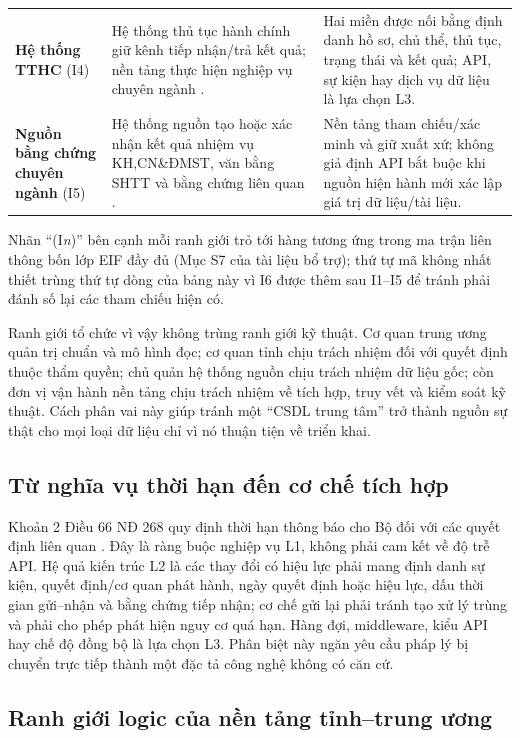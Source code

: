 {\begin{longtable}{@{}p{3.0cm}p{5.0cm}p{5.3cm}@{}}
\addlinespace
\textbf{Hệ thống TTHC} (I4) & Hệ thống thủ tục hành chính giữ kênh tiếp nhận/trả kết quả; nền tảng thực hiện nghiệp vụ chuyên ngành \citep{nd268_2025,nd278_2025}. & Hai miền được nối bằng định danh hồ sơ, chủ thể, thủ tục, trạng thái và kết quả; API, sự kiện hay dịch vụ dữ liệu là lựa chọn L3. \\
\addlinespace
\textbf{Nguồn bằng chứng chuyên ngành} (I5) & Hệ thống nguồn tạo hoặc xác nhận kết quả nhiệm vụ KH,CN\&ĐMST, văn bằng SHTT và bằng chứng liên quan \citep{nd268_2025}. & Nền tảng tham chiếu/xác minh và giữ xuất xứ; không giả định API bắt buộc khi nguồn hiện hành mới xác lập giá trị dữ liệu/tài liệu. \\
\end{longtable}
}

Nhãn ``(I\emph{n})'' bên cạnh mỗi ranh giới trỏ tới hàng tương ứng trong ma
trận liên thông bốn lớp EIF đầy đủ (Mục S7 của tài liệu bổ trợ); thứ tự mã
không nhất thiết trùng thứ tự dòng của bảng này vì I6 được thêm sau I1--I5
để tránh phải đánh số lại các tham chiếu hiện có.

Ranh giới tổ chức vì vậy không trùng ranh giới kỹ thuật. Cơ quan trung ương quản trị chuẩn và mô hình đọc; cơ quan tỉnh chịu trách nhiệm đối với quyết định thuộc thẩm quyền; chủ quản hệ thống nguồn chịu trách nhiệm dữ liệu gốc; còn đơn vị vận hành nền tảng chịu trách nhiệm về tích hợp, truy vết và kiểm soát kỹ thuật. Cách phân vai này giúp tránh một ``CSDL trung tâm'' trở thành nguồn sự thật cho mọi loại dữ liệu chỉ vì nó thuận tiện về triển khai.

\subsection{Từ nghĩa vụ thời hạn đến cơ chế tích hợp}
\label{subsec:sla}

Khoản 2 Điều 66 NĐ 268 quy định thời hạn thông báo cho Bộ đối với các quyết định liên quan \citep{nd268_2025}. Đây là ràng buộc nghiệp vụ L1, không phải cam kết về độ trễ API. Hệ quả kiến trúc L2 là các thay đổi có hiệu lực phải mang định danh sự kiện, quyết định/cơ quan phát hành, ngày quyết định hoặc hiệu lực, dấu thời gian gửi--nhận và bằng chứng tiếp nhận; cơ chế gửi lại phải tránh tạo xử lý trùng và phải cho phép phát hiện nguy cơ quá hạn. Hàng đợi, middleware, kiểu API hay chế độ đồng bộ là lựa chọn L3. Phân biệt này ngăn yêu cầu pháp lý bị chuyển trực tiếp thành một đặc tả công nghệ không có căn cứ.

\subsection{Ranh giới logic của nền tảng tỉnh--trung ương}
\label{subsec:ranhgioi}

